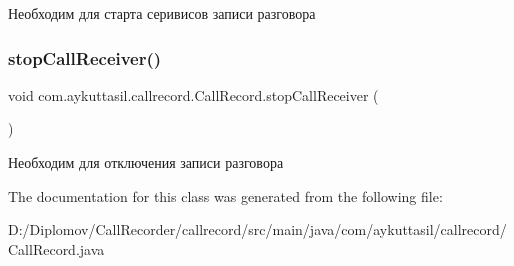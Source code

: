 Необходим для старта серивисов записи разговора \mbox{\label{classcom_1_1aykuttasil_1_1callrecord_1_1_call_record_a269eed369eac397c04aca3176c0715f7}} 
\subsubsection{\texorpdfstring{stop\+Call\+Receiver()}{stopCallReceiver()}}
{\footnotesize\ttfamily void com.\+aykuttasil.\+callrecord.\+Call\+Record.\+stop\+Call\+Receiver (\begin{DoxyParamCaption}{ }\end{DoxyParamCaption})}

Необходим для отключения записи разговора 

The documentation for this class was generated from the following file\+:\begin{DoxyCompactItemize}
\item 
D\+:/\+Diplomov/\+Call\+Recorder/callrecord/src/main/java/com/aykuttasil/callrecord/Call\+Record.\+java\end{DoxyCompactItemize}
